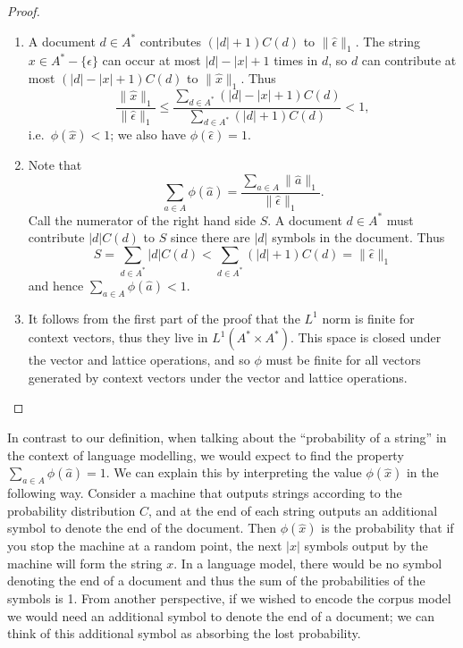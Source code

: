 \begin{proof}
\mbox{}
\begin{enumerate}
\item A document $d \in A^*$ contributes $(|d|+1)C(d)$ to $\|\hat{\epsilon}\|_1$. The string $x \in A^* - \{\epsilon\}$ can occur at most $|d| - |x| + 1$ times in $d$, so $d$ can contribute at most $(|d|- |x| + 1)C(d)$ to $\|\hat{x}\|_1$. Thus
$$\frac{\|\hat{x}\|_1}{\|\hat{\epsilon}\|_1} \le \frac{\sum_{d\in A^*} (|d| - |x| + 1)C(d)}{\sum_{d\in A^*} (|d|+1)C(d)} < 1,$$
i.e.~$\phi(\hat{x}) < 1$; we also have $\phi(\hat{\epsilon}) = 1$.

\item Note that 
$$\sum_{a\in A} \phi(\hat{a}) = \frac{\sum_{a\in A} \|\hat{a}\|_1}{\|\hat{\epsilon}\|_1}.$$
Call the numerator of the right hand side $S$. A document $d\in A^*$ must contribute $|d| C(d)$ to $S$ since there are $|d|$ symbols in the document. Thus 
$$S = \sum_{d\in A^*} |d| C(d) < \sum_{d\in A^*} (|d| + 1) C(d) = \|\hat{\epsilon}\|_1$$
and hence $\sum_{a \in A} \phi(\hat{a}) < 1$.

\item It follows from the first part of the proof that the  $L^1$ norm is finite for context vectors, thus they live in $L^1(A^*\times A^*)$. This space is closed under the vector and lattice operations, and so $\phi$ must be finite for all vectors generated by context vectors under the vector and lattice operations.
\end{enumerate}
\end{proof}



In contrast to our definition, when talking about the ``probability of a string'' in the context of language modelling, we would expect to find the property $\sum_{a \in A} \phi(\hat{a}) = 1$.
We can explain this by interpreting the value $\phi(\hat{x})$ in the following way. Consider a machine that outputs strings according to the probability distribution $C$, and at the end of each string outputs an additional symbol to denote the end of the document. Then $\phi(\hat{x})$ is the probability that if you stop the machine at a random point, the next $|x|$ symbols output by the machine will form the string $x$. In a language model, there would be no symbol denoting the end of a document and thus the sum of the probabilities of the symbols is 1. From another perspective, if we wished to encode the corpus model we would need an additional symbol to denote the end of a document; we can think of this additional symbol as absorbing the lost probability.

